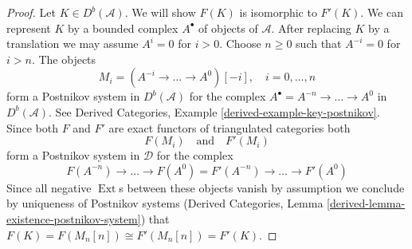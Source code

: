 \documentclass{stacks-project}
\theoremstyle{plain}
\theoremstyle{definition}
\theoremstyle{remark}
\numberwithin{equation}{subsection}
\def\Ext{\mathop{\mathrm{Ext}}\nolimits}
\begin{document}
\begin{proof}
Let $K \in D^b(\mathcal{A})$. We will show $F(K)$ is isomorphic to $F'(K)$.
We can represent $K$ by a bounded complex $A^\bullet$ of objects of
$\mathcal{A}$. After replacing $K$ by a translation we may
assume $A^i = 0$ for $i > 0$. Choose $n \geq 0$ such that $A^{-i} = 0$
for $i > n$. The objects
$$
M_i = (A^{-i} \to \ldots \to A^0)[-i],\quad i = 0, \ldots, n
$$
form a Postnikov system in $D^b(\mathcal{A})$ for the complex
$A^\bullet = A^{-n} \to \ldots \to A^0$ in $D^b(\mathcal{A})$.
See Derived Categories, Example \ref{derived-example-key-postnikov}.
Since both $F$ and $F'$ are exact functors of triangulated categories both
$$
F(M_i)
\quad\text{and}\quad
F'(M_i)
$$
form a Postnikov system in $\mathcal{D}$ for the complex
$$
F(A^{-n}) \to \ldots \to F(A^0) =
F'(A^{-n}) \to \ldots \to F'(A^0)
$$
Since all negative $\Ext$s between these objects vanish by assumption
we conclude by uniqueness of Postnikov systems
(Derived Categories, Lemma \ref{derived-lemma-existence-postnikov-system})
that $F(K) = F(M_n[n]) \cong F'(M_n[n]) = F'(K)$.
\end{proof}
\end{document}
